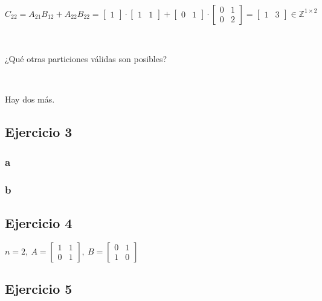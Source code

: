 \documentclass{article}
\begin{document}
\

$C_{22} = A_{21}B_{12} + A_{22}B_{22} =  
\begin{bmatrix}
    1
\end{bmatrix}
\cdot
\begin{bmatrix}
    1 & 1
\end{bmatrix}
+
\begin{bmatrix}
    0 & 1
\end{bmatrix}
\cdot
\begin{bmatrix}
    0 & 1 \\
    0 & 2
\end{bmatrix}
=
\begin{bmatrix}
    1 & 3
\end{bmatrix} \in \mathbb{Z}^{1\times 2}$

\

\noindent ¿Qué otras particiones válidas son posibles?

\

\noindent Hay dos más.

\subsection*{Ejercicio 3}

\subsubsection*{a}



\subsubsection*{b}

\subsection*{Ejercicio 4}

$n = 2, ~
A = \begin{bmatrix}
    1 & 1 \\
    0 & 1    
\end{bmatrix}, ~
B = \begin{bmatrix}
    0 & 1 \\
    1 & 0
\end{bmatrix}$


\subsection*{Ejercicio 5}
\end{document}
